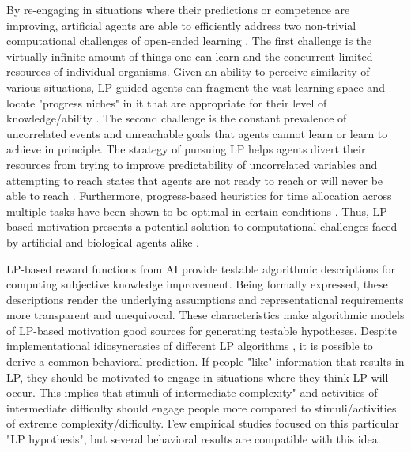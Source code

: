 By re-engaging in situations where their predictions or competence are improving, artificial agents are able to efficiently address two non-trivial computational challenges of open-ended learning \parencite{gottlieb_information-seeking_2013}. The first challenge is the virtually infinite amount of things one can learn and the concurrent limited resources of individual organisms. Given an ability to perceive similarity of various situations, \ac{LP}-guided agents can fragment the vast learning space and locate "progress niches" in it that are appropriate for their level of knowledge/ability \parencite[e.g. ][]{oudeyer_intrinsic_2007,forestier_intrinsically_2020,etcheverry_hierarchically_2021}. The second challenge is the constant prevalence of uncorrelated events and unreachable goals that agents cannot learn or learn to achieve in principle. The strategy of pursuing \ac{LP} helps agents divert their resources from trying to improve predictability of uncorrelated variables and attempting to reach states that agents are not ready to reach or will never be able to reach \parencite[e.g., ][]{forestier_intrinsically_2020, colas_curious_2019}. Furthermore, progress-based heuristics for time allocation across multiple tasks have been shown to be optimal in certain conditions \parencite{son_metacognitive_2006,lopes_strategic_2012}. Thus, \ac{LP}-based motivation presents a potential solution to computational challenges faced by artificial and biological agents alike \parencite{gottlieb_information-seeking_2013,gottlieb_towards_2018,oudeyer_computational_2018}.

\ac{LP}-based reward functions from \ac{AI} provide testable algorithmic descriptions for computing subjective knowledge improvement. Being formally expressed, these descriptions render the underlying assumptions and representational requirements more transparent and unequivocal. These characteristics make algorithmic models of \ac{LP}-based motivation good sources for generating testable hypotheses. Despite implementational idiosyncrasies of different \ac{LP} algorithms \parencite[see][]{oudeyer_intrinsic_2007,linke_adapting_2020}, it is possible to derive a common behavioral prediction. If people "like" information that results in \ac{LP}, they should be motivated to engage in situations where they think \ac{LP} will occur. This implies that stimuli of intermediate complexity" and activities of intermediate difficulty should engage people more compared to stimuli/activities of extreme complexity/difficulty. Few empirical studies focused on this particular "\ac{LP} hypothesis", but several behavioral results are compatible with this idea.


